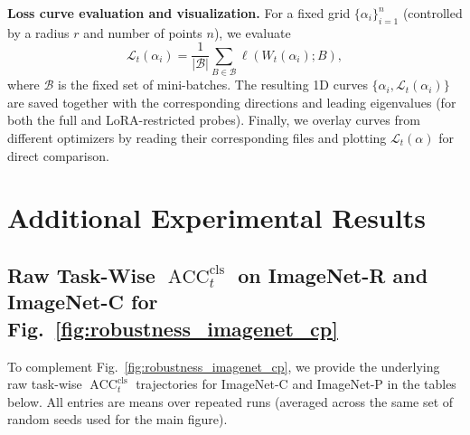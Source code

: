 \documentclass{article}
\theoremstyle{plain}
\theoremstyle{definition}
\theoremstyle{remark}
\begin{document}

\noindent\textbf{Loss curve evaluation and visualization.}
For a fixed grid $\{\alpha_i\}_{i=1}^n$ (controlled by a radius $r$ and number of points $n$), we evaluate
$$
\mathcal{L}_t(\alpha_i)
=
\frac{1}{|\mathcal B|}\sum_{B\in\mathcal B}\ell\!\left(W_t(\alpha_i);B\right),
$$
where $\mathcal B$ is the fixed set of mini-batches.
The resulting 1D curves $\{\alpha_i,\mathcal L_t(\alpha_i)\}$ are saved together with the corresponding directions and leading eigenvalues (for both the full and LoRA-restricted probes).
Finally, we overlay curves from different optimizers by reading their corresponding files and plotting $\mathcal L_t(\alpha)$ for direct comparison.







\section{Additional Experimental Results}


\subsection{Raw Task-Wise $\operatorname{ACC}^{\mathrm{cls}}_t$ on ImageNet-R and ImageNet-C for Fig.~\ref{fig:robustness_imagenet_cp}}

To complement Fig.~\ref{fig:robustness_imagenet_cp}, we provide the underlying raw task-wise $\operatorname{ACC}^{\mathrm{cls}}_t$ trajectories for ImageNet-C and ImageNet-P in the tables below.
All entries are {means over repeated runs} (averaged across the same set of random seeds used for the main figure).
\end{document}
